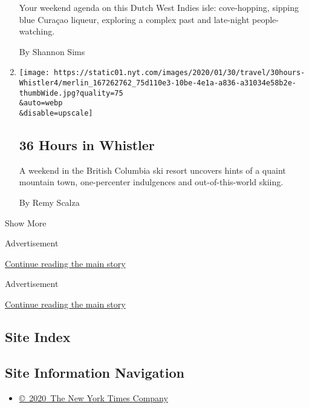 \begin{enumerate}
  Your weekend agenda on this Dutch West Indies isle: cove-hopping,
  sipping blue Curaçao liqueur, exploring a complex past and late-night
  people-watching.

  By Shannon Sims
\item
  \href{/2020/01/30/travel/what-to-do-36-hours-in-whistler-british-columbia.html}{}

  \texttt{[image: https://static01.nyt.com/images/2020/01/30/travel/30hours-Whistler4/merlin\_167262762\_75d110e3-10be-4e1a-a836-a31034e58b2e-thumbWide.jpg?quality=75\\\&auto=webp\\\&disable=upscale]}

  \hypertarget{36-hours-in-whistler}{%
  \subsection{36 Hours in Whistler}\label{36-hours-in-whistler}}

  A weekend in the British Columbia ski resort uncovers hints of a
  quaint mountain town, one-percenter indulgences and out-of-this-world
  skiing.

  By Remy Scalza
\end{enumerate}

Show More

Advertisement

\protect\hyperlink{after-mid1}{Continue reading the main story}

Advertisement

\protect\hyperlink{after-mktg}{Continue reading the main story}

\hypertarget{site-index}{%
\subsection{Site Index}\label{site-index}}

\hypertarget{site-information-navigation}{%
\subsection{Site Information
Navigation}\label{site-information-navigation}}

\begin{itemize}
\tightlist
\item
  \href{https://help.nytimes.com/hc/en-us/articles/115014792127-Copyright-notice}{©~2020~The
  New York Times Company}
\end{itemize}

